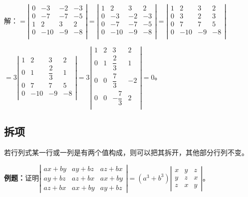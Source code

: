 解：$=\left|\begin{array}{cccc} 
    0 & -3 & -2 & -3 \\
    0 & -7  & -7 & -5 \\
    1 & 2 & 3 & 2 \\
    0 & -10 & -9 & -8 \\
\end{array}\right|=\left|\begin{array}{cccc} 
    1 & 2 & 3 & 2 \\
    0 & -3 & -2 & -3 \\
    0 & -7  & -7 & -5 \\
    0 & -10 & -9 & -8 \\
\end{array}\right|=\left|\begin{array}{cccc} 
    1 & 2 & 3 & 2 \\
    0 & 3 & 2 & 3 \\
    0 & 7  & 7 & 5 \\
    0 & -10 & -9 & -8 \\
\end{array}\right|$

$=3\left|\begin{array}{cccc} 
    1 & 2 & 3 & 2 \\
    0 & 1 & \dfrac{2}{3} & 1 \\
    0 & 7  & 7 & 5 \\
    0 & -10 & -9 & -8 \\
\end{array}\right|
=3\left|\begin{array}{cccc} 
    1 & 2 & 3 & 2 \\
    0 & 1 & \dfrac{2}{3} & 1 \\
    0 & 0  & \dfrac{7}{3} & -2 \\
    0 & 0  & -\dfrac{7}{3} & 2 \\
\end{array}\right|=0$。

\subsection{拆项}

若行列式某一行或一列是有两个值构成，则可以把其拆开，其他部分行列不变。

\textbf{例题：}证明$\left|\begin{array}{ccc}
    ax+by & ay+bz & az+bx \\
    ay+bz & az+bx & ax+by \\
    az+bx & ax+by & ay+bz
\end{array}\right|=(a^3+b^3)\left|\begin{array}{ccc}
    x & y & z \\
    y & z & x \\
    z & x & y
\end{array}\right|$。


